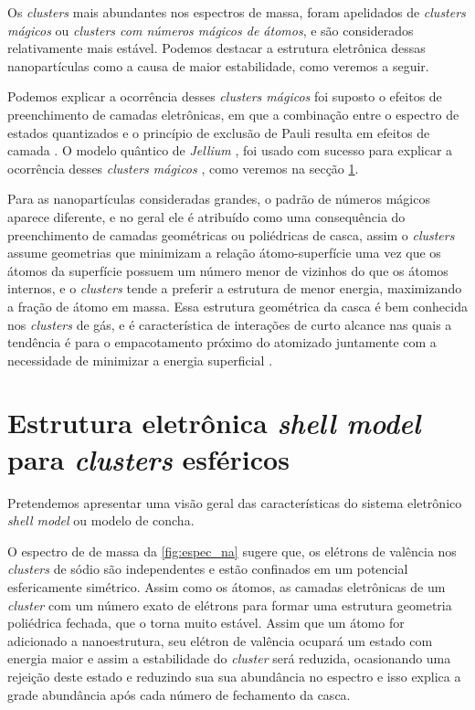 Os \textit{clusters} mais abundantes
nos espectros de massa, foram apelidados de \textit{clusters mágicos} ou \textit{clusters com números mágicos de átomos}, e são considerados relativamente mais estável. Podemos destacar a estrutura eletrônica dessas nanopartículas como a causa de maior estabilidade, como veremos a seguir.

Podemos explicar a ocorrência desses \textit{clusters mágicos} foi suposto o efeitos de preenchimento de camadas eletrônicas, em que a combinação entre o espectro de estados
quantizados e o princípio de exclusão de Pauli resulta em efeitos de camada \cite{Brack}. O modelo quântico de \textit{Jellium} \cite{Heer}, foi usado com sucesso para explicar a ocorrência desses \textit{clusters mágicos} \cite{capitulo_livro_shell}, como veremos na secção \ref{section_shell_model}.

Para as nanopartículas consideradas grandes, o padrão de números mágicos aparece diferente, e no geral ele é atribuído como uma consequência do preenchimento de camadas geométricas ou poliédricas de casca, assim o \textit{clusters} assume geometrias que minimizam a relação átomo-superfície uma vez que os átomos da superfície possuem um número menor de vizinhos do que os átomos internos, e o \textit{clusters} tende a preferir a estrutura de menor energia, maximizando a fração de átomo em massa. Essa estrutura geométrica da casca é bem conhecida nos \textit{clusters} de gás, e é característica de interações de curto alcance nas quais a tendência é para o empacotamento próximo do atomizado juntamente com a necessidade de minimizar a energia superficial \cite{capitulo_livro_shell}.


\section{Estrutura eletrônica \textit{shell model} para \textit{clusters} esféricos} \label{section_shell_model}

Pretendemos apresentar uma visão geral das características do sistema eletrônico \textit{shell model} ou modelo de concha.

O espectro de de massa da \ref{fig:espec_na} sugere que, os elétrons de valência nos \textit{clusters} de sódio são independentes e estão confinados em um potencial esfericamente simétrico. Assim como os átomos, as camadas eletrônicas de um \textit{cluster} com um número exato de elétrons para formar uma estrutura geometria poliédrica fechada, que o torna muito estável. Assim que um átomo for adicionado a nanoestrutura, seu elétron de valência ocupará um estado com energia maior e assim a estabilidade do \textit{cluster} será reduzida, ocasionando uma rejeição deste estado e reduzindo sua sua abundância no espectro e isso explica a grade abundância após cada número de fechamento da casca\cite{capitulo_livro_shell}.


